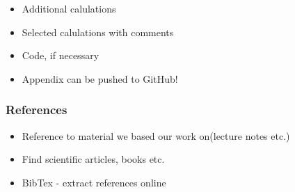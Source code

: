 \documentclass[12pt]{article}
\begin{document}
\begin{itemize}
\item Additional calulations
\item Selected calulations with comments
\item Code, if necessary
\item Appendix can be pushed to GitHub!
\end{itemize}

\subsubsection*{References}

\begin{itemize}
\item Reference to material we based our work on(lecture notes etc.)
\item Find scientific articles, books etc.
\item BibTex - extract references online
\end{itemize}
\end{document}
